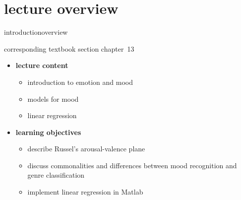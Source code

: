 


\subtitle{Module 13: Mood Recognition}


	

    \section[overview]{lecture overview}
        \begin{frame}{introduction}{overview}
            \begin{block}{corresponding textbook section}
                    chapter~13
            \end{block}

            \begin{itemize}
                \item   \textbf{lecture content}
                    \begin{itemize}
                        \item   introduction to emotion and mood
                        \item   models for mood
                        \item   linear regression
                    \end{itemize}
                \bigskip
                \item<2->   \textbf{learning objectives}
                    \begin{itemize}
                        \item   describe Russel's arousal-valence plane
                        \item   discuss commonalities and differences between mood recognition and genre classification
                        \item   implement linear regression in Matlab
                    \end{itemize}
            \end{itemize}
        \end{frame}

